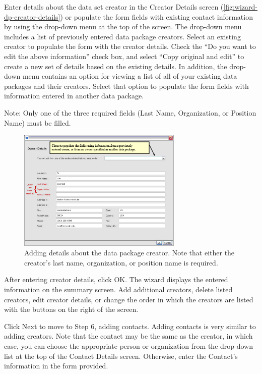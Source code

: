 Enter details about the data set creator in the Creator Details screen
(\autoref{fig:wizard-dp-creator-details}) or populate the form fields with
existing contact information by using the drop-down menu at the top of
the screen. The drop-down menu includes a list of previously entered
data package creators. Select an existing creator to populate the form with
the creator details. Check the ``Do you want to edit the above
information'' check box, and select ``Copy original and edit'' to create
a new set of details based on the existing details. In addition, the
drop-down menu contains an option for viewing a list of all of your
existing data packages and their creators. Select that option to populate
the form fields with information entered in another data package. 

Note: Only one of the three required fields (Last Name, Organization, or
Position Name) must be filled. 

\begin{figure}
  \centering
    \includegraphics[width=0.7\textwidth]{images/wizard-dp-creator-details.jpg}
  \caption{Adding details about the data package creator. Note that either
    the creator's last name, organization, or position name is required.}
  \label{fig:wizard-dp-creator-details}
\end{figure}

After entering creator details, click OK. The wizard displays the entered
information on the summary screen. Add additional creators, delete listed
creators, edit creator details, or change the order in which the creators are
listed with the buttons on the right of the screen. 

Click Next to move to Step 6, adding contacts. Adding contacts is very
similar to adding creators. Note that the contact may be the same as the
creator, in which case, you can choose the appropriate person or
organization from the drop-down list at the top of the Contact Details
screen. Otherwise, enter the Contact's information in the form provided.

